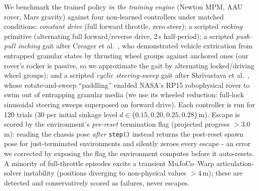 \documentclass[conference]{IEEEtran}
\begin{document}
We benchmark the trained policy \emph{in the training engine} (Newton MPM, AAU
rover, Mars gravity) against four non-learned controllers under matched
conditions: \emph{constant drive} (full forward throttle, zero steer); a
scripted \emph{rocking} primitive (alternating full forward/reverse drive,
$2$\,s half-period); a scripted \emph{push--pull inching} gait after
Creager et al.~\cite{creager2015pushpull}, who demonstrated vehicle
extrication from entrapped granular states by thrusting wheel groups against
anchored ones (our rover's rocker is passive, so we approximate the gait by
alternating locked/driving wheel groups); and a scripted \emph{cyclic
steering-sweep} gait after Shrivastava et al.~\cite{shrivastava2020material},
whose rotate-and-sweep ``paddling'' enabled NASA's RP15 robophysical rover to
swim out of entrapping granular media (we use its wheeled reduction:
full-lock sinusoidal steering sweeps superposed on forward drive). Each controller is run for 120 trials (30 per initial
sinkage level $d\in\{0.15,0.20,0.25,0.28\}$\,m). Escape is scored by the
environment's \emph{pre-reset} termination flag (projected progress $>3.0$\,m):
reading the chassis pose \emph{after} \texttt{step()} instead returns the
post-reset spawn pose for just-terminated environments and silently zeroes every
escape - an error we corrected by exposing the flag the environment computes
before it auto-resets. A minority of full-throttle episodes excite a transient
MuJoCo--Warp articulation-solver instability (positions diverging to
non-physical values $>4$\,m); these are detected and conservatively scored as
failures, never escapes.
\end{document}
